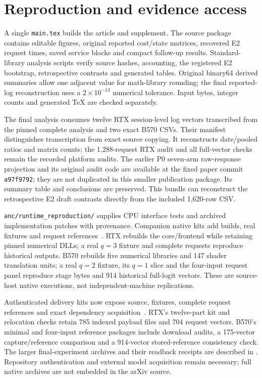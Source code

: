 \section{Reproduction and evidence access}
\label{supp:reproduction}
A single \texttt{main.tex} builds the article and supplement. The source package contains editable figures, original reported cost/state matrices, recovered E2 request times, saved service blocks and compact follow-up results. Standard-library analysis scripts verify source hashes, accounting, the registered E2 bootstrap, retrospective contrasts and generated tables. Original binary64 derived summaries allow one adjacent value for math-library rounding; the final reported-log reconstruction uses a $2\times10^{-13}$ numerical tolerance. Input bytes, integer counts and generated TeX are checked separately.

The final analysis consumes twelve RTX session-level log vectors transcribed from the pinned complete analysis and two exact B570 CSVs. Their manifest distinguishes transcription from exact source copying. It reconstructs date/pooled ratios and matrix counts; the 1,288-request RTX audit and all full-vector checks remain the recorded platform audits. The earlier P0 seven-arm raw-response projection and its original audit code are available at the fixed paper commit \texttt{a97f9792}; they are not duplicated in this smaller publication package. Its summary table and conclusions are preserved. This bundle can reconstruct the retrospective E2 draft contrasts directly from the included 1,620-row CSV.

\texttt{anc/runtime\_reproduction/} supplies CPU interface tests and archived implementation patches with provenance. Companion native kits add builds, real fixtures and request references~\cite{rtxnativebridge,b570nativereproduction}. RTX rebuilds the core/frontend while retaining pinned numerical DLLs; a real $q=3$ fixture and complete requests reproduce historical outputs. B570 rebuilds five numerical libraries and 147 shader translation units; a real $q=2$ fixture, its $q=1$ slice and the four-input request panel reproduce stage bytes and 914 historical full-logit vectors. These are source-host native executions, not independent-machine replications.

Authenticated delivery kits now expose source, fixtures, complete request references and exact dependency acquisition~\cite{rtxnativedelivery,b570nativedelivery}. RTX's twelve-part kit and relocation checks retain 785 indexed payload files and 704 request vectors. B570's minimal and four-input reference packages include download audits, a 175-vector capture/reference comparison and a 914-vector stored-reference consistency check. The larger final-experiment archives and their readback receipts are described in . Repository authentication and external model acquisition remain necessary; full native archives are not embedded in the arXiv source.

